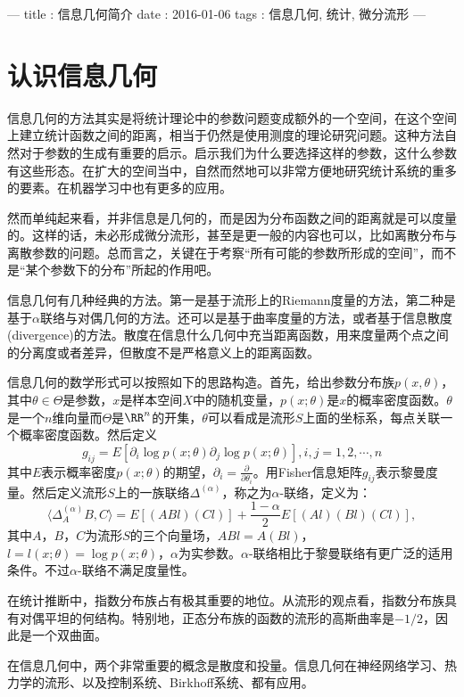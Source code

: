 ---
title : 信息几何简介
date  : 2016-01-06
tags  : 信息几何, 统计, 微分流形
---

\section{认识信息几何}

信息几何的方法其实是将统计理论中的参数问题变成额外的一个空间，在这个空间上建立统计函数之间的距离，相当于仍然是使用测度的理论研究问题。这种方法自然对于参数的生成有重要的启示。启示我们为什么要选择这样的参数，这什么参数有这些形态。在扩大的空间当中，自然而然地可以非常方便地研究统计系统的重多的要素。在机器学习中也有更多的应用。

然而单纯起来看，并非信息是几何的，而是因为分布函数之间的距离就是可以度量的。这样的话，未必形成微分流形，甚至是更一般的内容也可以，比如离散分布与离散参数的问题。总而言之，关键在于考察“所有可能的参数所形成的空间”，而不是“某个参数下的分布”所起的作用吧。

信息几何有几种经典的方法。第一是基于流形上的Riemann度量的方法，第二种是基于$\alpha$联络与对偶几何的方法。还可以是基于曲率度量的方法，或者基于信息散度(divergence)的方法。散度在信息什么几何中充当距离函数，用来度量两个点之间的分离度或者差异，但散度不是严格意义上的距离函数。

信息几何的数学形式可以按照如下的思路构造。首先，给出参数分布族$p(x,\theta)$，其中$\theta \in \Theta$是参数，$x$是样本空间$X$中的随机变量，$p(x;\theta)$是$x$的概率密度函数。$\theta$是一个$n$维向量而$\Theta$是$\RR^n$的开集，$\theta$可以看成是流形$S$上面的坐标系，每点关联一个概率密度函数。然后定义　
\[ g_{ij} = E[\partial_i \log p(x;\theta) \partial_j \log p(x;\theta)],
i,j=1,2,\cdots,n \]
其中$E$表示概率密度$p(x;\theta)$的期望，$\partial_i = \frac{\partial}{\partial \theta_i}$。用Fisher信息矩阵$g_{ij}$表示黎曼度量。然后定义流形$S$上的一族联络$\Delta^{(\alpha)}$，称之为$\alpha$-联络，定义为：
\[ \langle \Delta_A^{(\alpha)}B, C \rangle = E[(ABl)(Cl)] + 
    \frac{1-\alpha}{2} E[(Al)(Bl)(Cl)],
\]
其中$A$，$B$，$C$为流形$S$的三个向量场，$ABl=A(Bl)$，$l=l(x;\theta)=\log p(x;\theta)$，$\alpha$为实参数。$\alpha$-联络相比于黎曼联络有更广泛的适用条件。不过$\alpha$-联络不满足度量性。

在统计推断中，指数分布族占有极其重要的地位。从流形的观点看，指数分布族具有对偶平坦的何结构。特别地，正态分布族的函数的流形的高斯曲率是$-1/2$，因此是一个双曲面。

在信息几何中，两个非常重要的概念是散度和投量。信息几何在神经网络学习、热力学的流形、以及控制系统、Birkhoff系统、都有应用。



